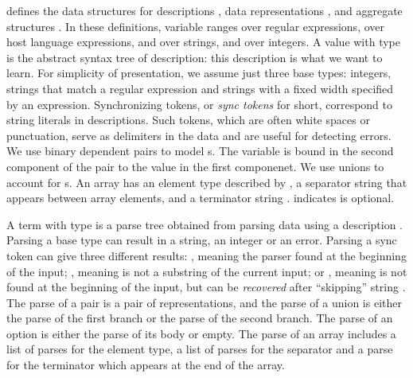
 defines
the data structures for descriptions , data
representations , and aggregate structures .
In these definitions,  variable  ranges over regular expressions,
 over host language expressions,
 and  over strings, and  over integers.
A value with type  is the abstract syntax tree of \pads{}
description: this description is what we want to learn.  
For simplicity of presentation, we assume just three base types: 
integers, strings that match a regular expression and strings with a
fixed width specified by an expression. Synchronizing
tokens, or {\em sync tokens} for short, correspond to string literals
in \pads{} descriptions.  Such tokens, which are often
white spaces or punctuation,
serve as delimiters in the data and are useful for detecting
errors. We use binary dependent pairs  to model s. 
The variable  is bound in the second component of the
pair to the value in the first componenet.
We use  unions to account for s. 
An array  has an element type described by , a separator
string  that appears between array elements, and a
terminator string .  indicates  is optional.

A term with type  is a parse tree obtained from parsing 
data using a description .  Parsing a base type can result in a
string, an integer or an error.  Parsing a sync token
 can give three different results: , meaning the
parser found  at the beginning of the input; , meaning
 is not a substring of the current input; or ,
meaning  is not found at the beginning of the input, but
can be {\em recovered} after ``skipping'' string .  The parse
of a pair is a pair of representations, and the parse of a union is
either the parse of the first branch or the parse of the second
branch. The parse of an option is either the parse of its body or  empty.
The parse of an array includes a list of parses for the
element type, a list of parses for the separator and a parse for the
terminator which appears at the end of the array.

